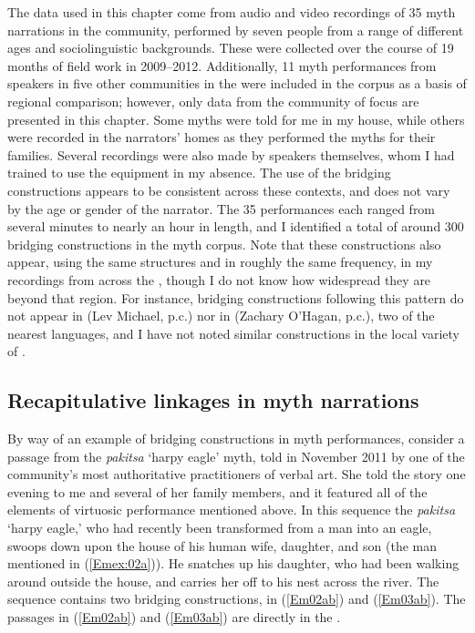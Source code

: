 \documentclass[output=paper]{LSP/langsci}
\begin{document}
The data used in this chapter come from audio and video recordings of 35 myth narrations in the community, performed by seven people from a range of different ages and sociolinguistic backgrounds. These were collected over the course of 19 months of field work in 2009--2012. Additionally, 11 myth performances from speakers in five other communities in the  were included in the corpus as a basis of regional comparison; however, only data from the community of focus are presented in this chapter. Some myths were told for me in my house, while others were recorded in the narrators’ homes as they performed the myths for their families. Several recordings were also made by  speakers themselves, whom I had trained to use the equipment in my absence. The use of the bridging constructions appears to be consistent across these contexts, and does not vary by the age or gender of the narrator. The 35 performances each ranged from several minutes to nearly an hour in length, and I identified a total of around 300 bridging constructions in the myth corpus. Note that these constructions also appear, using the same structures and in roughly the same frequency, in my recordings from across the , though I do not know how widespread they are beyond that region. For instance, bridging constructions following this pattern do not appear in  (Lev Michael, p.c.) nor in  (Zachary O’Hagan, p.c.), two of the nearest  languages, and I have not noted similar constructions in the local variety of . 

\subsection{Recapitulative linkages in myth narrations}
\label{Emrecap.myth}
By way of an example of bridging constructions in  myth performances, consider a passage from the \textit{pakitsa} `harpy eagle' myth, told in November 2011 by one of the community’s most authoritative practitioners of  verbal art. She told the story one evening to me and several of her family members, and it featured all of the elements of virtuosic performance mentioned above. In this sequence the \textit{pakitsa} `harpy eagle,' who had recently been transformed from a man into an eagle, swoops down upon the house of his human wife, daughter, and son (the man mentioned in (\ref{Emex:02a})). He snatches up his daughter, who had been walking around outside the house, and carries her off to his nest across the river. The sequence contains two bridging constructions, in (\ref{Em02ab}) and (\ref{Em03ab}). The passages in (\ref{Em02ab}) and (\ref{Em03ab}) are directly  in the . 
\end{document}
